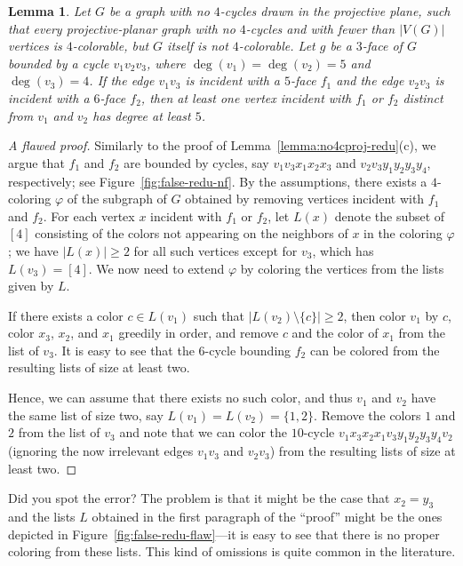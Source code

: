 \documentclass[12pt,twoside,openright,a4paper]{book}
\newtheorem{lemma}[theorem]{Lemma}
\begin{document}
\begin{lemma}\label{lemma:false-redu}
Let $G$ be a graph with no $4$-cycles drawn in the projective plane, such that every projective-planar graph
with no $4$-cycles and with fewer than $|V(G)|$ vertices is $4$-colorable, but $G$ itself is not $4$-colorable.
Let $g$ be a $3$-face of $G$ bounded by a cycle $v_1v_2v_3$, where $\deg(v_1)=\deg(v_2)=5$ and $\deg(v_3)=4$.
If the edge $v_1v_3$ is incident with a $5$-face $f_1$ and the edge $v_2v_3$ is incident with a $6$-face $f_2$,
then at least one vertex incident with $f_1$ or $f_2$ distinct from $v_1$ and $v_2$ has degree at least $5$.
\end{lemma}
\begin{proof}[A flawed proof]
Similarly to the proof of Lemma~\ref{lemma:no4cproj-redu}(c), we argue that $f_1$ and $f_2$ are bounded by cycles,
say $v_1v_3x_1x_2x_3$ and $v_2v_3y_1y_2y_3y_4$, respectively; see Figure~\ref{fig:false-redu-nf}.  By the assumptions, there exists a $4$-coloring $\varphi$
of the subgraph of $G$ obtained by removing vertices incident with $f_1$ and $f_2$.
For each vertex $x$ incident with $f_1$ or $f_2$, let $L(x)$ denote the subset of $[4]$ consisting of the colors not
appearing on the neighbors of $x$ in the coloring $\varphi$; we have $|L(x)|\ge 2$ for all such vertices except for $v_3$,
which has $L(v_3)=[4]$.  We now need to extend $\varphi$ by coloring the vertices from the lists given by $L$.

If there exists a color $c\in L(v_1)$ such that $|L(v_2)\setminus \{c\}|\ge 2$, then color $v_1$ by $c$, color
$x_3$, $x_2$, and $x_1$ greedily in order, and remove $c$ and the color of $x_1$ from the list of $v_3$.  It is
easy to see that the $6$-cycle bounding $f_2$ can be colored from the resulting lists of size at least two.

Hence, we can assume that there exists no such color, and thus $v_1$ and $v_2$ have the same list of size two, say $L(v_1)=L(v_2)=\{1,2\}$.
Remove the colors $1$ and $2$ from the list of $v_3$ and note that we can color the $10$-cycle $v_1x_3x_2x_1v_3y_1y_2y_3y_4v_2$ (ignoring the now
irrelevant edges $v_1v_3$ and $v_2v_3$) from the resulting lists of size at least two.
\end{proof}
Did you spot the error?  The problem is that it might be the case that $x_2=y_3$ and the lists $L$ obtained in the first paragraph
of the ``proof'' might be the ones depicted in Figure~\ref{fig:false-redu-flaw}---it is easy to see that there is no proper coloring
from these lists.  This kind of omissions is quite common in the literature.
\end{document}
